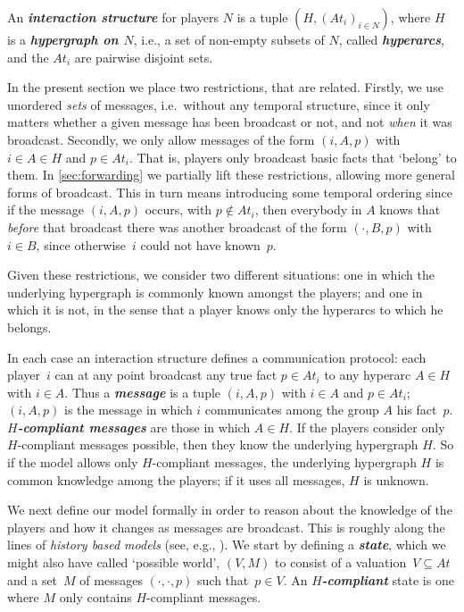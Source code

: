 \documentclass{article}
\newcounter{#1}
\newcommand{\state}[1][]{\ensuremath{(V#1,M#1)}\xspace}
\newcommand{\dfn}[1]{\emph{\bfseries #1}}
\newcommand{\msg}[3]{\ensuremath{(#1,#2,#3)}\xspace}
\newcommand{\bits}{\ensuremath{At}\xspace}
\begin{document}
An \dfn{interaction structure} for players $N$ is a tuple $(H,
(\bits_i)_{i \in N})$, where $H$ is a \dfn{hypergraph on $N$}, i.e.,  a
set of non-empty subsets of $N$, called \dfn{hyperarcs}, and the $At_i$ are pairwise disjoint sets.

In the present section we place two restrictions, that are related.
Firstly, we use unordered \emph{sets} of messages,
i.e.~without any temporal structure, since it only matters
whether a given message has been broadcast or not,
and not \emph{when} it was broadcast.  Secondly, we only allow
messages of the form $\msg{i}{A}{p}$ with $i\in A\in H$ and $p\in\bits_i$.
That is, players only broadcast basic facts that `belong' to them.
In \cref{sec:forwarding} we partially lift these restrictions,
allowing more general forms of broadcast.  This in turn
means introducing some temporal ordering since if the
message $\msg{i}{A}{p}$ occurs, with $p\not\in\bits_i$, then everybody in
$A$ knows that \emph{before} that broadcast there was another
broadcast of the form $\msg{\cdot}{B}{p}$ with $i \in B$,
since otherwise~$i$ could not have known~$p$.

Given these restrictions, we consider two different situations:
one in which the underlying hypergraph is commonly known amongst the players;
and one in which it is not,
in the sense that a player knows only the hyperarcs to which he belongs.

In each case an interaction structure defines a
communication protocol: each player~$i$ can at any point broadcast
any true fact $p \in \bits_i$ to any hyperarc $A \in H$ with $i \in A$.
Thus a \dfn{message} is a tuple $\msg{i}{A}{p}$
with $i \in A$ and $p\in\bits_i$; $\msg{i}{A}{p}$ is the message in which $i$
communicates among the group $A$ his fact~$p$.
\dfn{$H$-compliant messages} are those in which $A \in H$.
If the players consider only $H$-compliant messages possible,
then they know the underlying hypergraph $H$.
So if the model allows only $H$-compliant messages, the
underlying hypergraph $H$ is common knowledge among the players;
if it uses all messages, $H$ is unknown.

We next define our model formally in order to reason about the
knowledge of the players and how it changes as messages are broadcast.
This is roughly along the lines of \emph{history based models}
(see, e.g., \citet{pacuit_reasoning_2007,FHMV_RAK}).
We start by defining a \dfn{state}, which we might also have called `possible world', \state
to consist of a valuation~$V \subseteq \bits$
and a set~$M$ of messages $\msg{\cdot}{\cdot}{p}$ such that~$p \in V$.
An \dfn{$H$-compliant} state is one where $M$ only contains $H$-compliant messages.
\end{document}
